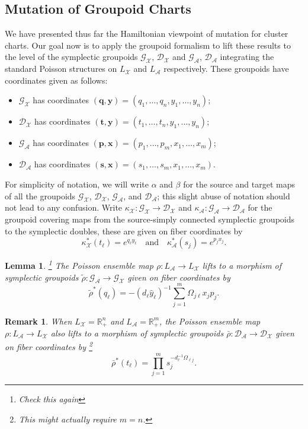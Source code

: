 \documentclass{amsart}
\newtheorem{lemma}[theorem]{Lemma}
\newtheorem{remark}[theorem]{Remark}
\numberwithin{equation}{section}
\newcommand{\bfp}{\mathbf{p}}
\newcommand{\bfq}{\mathbf{q}}
\newcommand{\bfs}{\mathbf{s}}
\newcommand{\bft}{\mathbf{t}}
\newcommand{\bfx}{\mathbf{x}}
\newcommand{\bfy}{\mathbf{y}}
\newcommand{\cA}{\mathcal{A}}
\newcommand{\cG}{\mathcal{G}}
\newcommand{\cD}{\mathcal{D}}
\newcommand{\cX}{\mathcal{X}}
\newcommand{\RR}{\mathbb{R}}
\begin{document}
\subsection{Mutation of Groupoid Charts}
We have presented thus far the Hamiltonian viewpoint of mutation for cluster charts.
Our goal now is to apply the groupoid formalism to lift these results to the level of the symplectic groupoids $\cG_\cX$, $\cD_\cX$ and $\cG_\cA$, $\cD_\cA$ integrating the standard Poisson structures on $L_\cX$ and $L_\cA$ respectively.
These groupoids have coordinates given as follows:
\begin{itemize}
  \item $\cG_\cX$ has coordinates $(\bfq,\bfy)=(q_1,\ldots,q_n,y_1,\ldots,y_n)$; 
  \item $\cD_\cX$ has coordinates $(\bft,\bfy)=(t_1,\ldots,t_n,y_1,\ldots,y_n)$; 
  \item $\cG_\cA$ has coordinates $(\bfp,\bfx)=(p_1,\ldots,p_m,x_1,\ldots,x_m)$; 
  \item $\cD_\cA$ has coordinates $(\bfs,\bfx)=(s_1,\ldots,s_m,x_1,\ldots,x_m)$.
\end{itemize}
For simplicity of notation, we will write $\alpha$ and $\beta$ for the source and target maps of all the groupoids $\cG_\cX$, $\cD_\cX$, $\cG_\cA$, and $\cD_\cA$; this slight abuse of notation should not lead to any confusion.
Write $\kappa_\cX:\cG_\cX\to\cD_\cX$ and $\kappa_\cA:\cG_\cA\to\cD_\cA$ for the groupoid covering maps from the source-simply connected symplectic groupoids to the symplectic doubles, these are given on fiber coordinates by
\[\kappa_\cX^*(t_\ell)=e^{q_\ell y_\ell}\quad\text{and}\quad\kappa_\cA^*(s_j)=e^{p_j x_j}.\]
\begin{lemma}
  \footnote{Check this again}
  The Poisson ensemble map $\rho:L_\cA\to L_\cX$ lifts to a morphism of symplectic groupoids $\tilde\rho:\cG_\cA\to\cG_\cX$ given on fiber coordinates by 
  \[\tilde\rho^*(q_\ell)=-(d_\ell\hat y_\ell)^{-1}\sum\limits_{j=1}^m\Omega_{j\ell}x_jp_j.\]
\end{lemma}
\begin{remark}
  When $L_\cX=\RR_+^n$ and $L_\cA=\RR_+^m$, the Poisson ensemble map $\rho:L_\cA\to L_\cX$ also lifts to a morphism of symplectic groupoids $\bar\rho:\cD_\cA\to\cD_\cX$ given on fiber coordinates by 
  \footnote{This might actually require $m=n$.}
  \[\bar\rho^*(t_\ell)=\prod\limits_{j=1}^m s_j^{-d_\ell^{-1}\Omega_{\ell j}}.\]
\end{remark}
\end{document}
